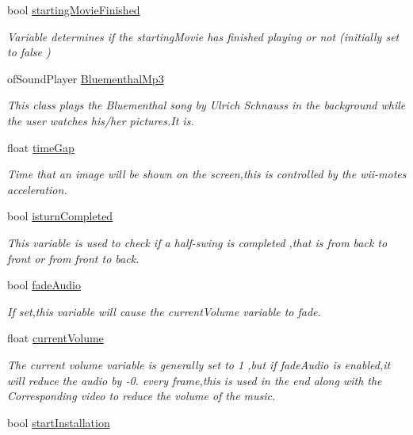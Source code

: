 \begin{DoxyCompactItemize}
bool \hyperlink{classtest_app_aea3cb9f5f0061a42a4953d6b6c949036}{starting\-Movie\-Finished}
\begin{DoxyCompactList}\small\item\em Variable determines if the starting\-Movie has finished playing or not (initially set to false ) \end{DoxyCompactList}\item 
of\-Sound\-Player \hyperlink{classtest_app_af696fd13ee9ecb38ac0ba0b72543ce06}{Bluementhal\-Mp3}
\begin{DoxyCompactList}\small\item\em This class plays the Bluementhal song by Ulrich Schnauss in the background while the user watches his/her pictures.\-It is. \end{DoxyCompactList}\item 
float \hyperlink{classtest_app_a944f2713019239a4b49241a5cc9a00c9}{time\-Gap}
\begin{DoxyCompactList}\small\item\em Time that an image will be shown on the screen,this is controlled by the wii-\/motes acceleration. \end{DoxyCompactList}\item 
bool \hyperlink{classtest_app_a42478a80a90ce9f663c04bcdaea5c5bd}{isturn\-Completed}
\begin{DoxyCompactList}\small\item\em This variable is used to check if a half-\/swing is completed ,that is from back to front or from front to back. \end{DoxyCompactList}\item 
bool \hyperlink{classtest_app_a918c09b5a4389a8402cfacb25d390226}{fade\-Audio}
\begin{DoxyCompactList}\small\item\em If set,this variable will cause the current\-Volume variable to fade. \end{DoxyCompactList}\item 
float \hyperlink{classtest_app_a51c20c5432d9f6b06f719526d9a34ee6}{current\-Volume}
\begin{DoxyCompactList}\small\item\em The current volume variable is generally set to 1 ,but if fade\-Audio is enabled,it will reduce the audio by -\/0. every frame,this is used in the end along with the Corresponding video to reduce the volume of the music. \end{DoxyCompactList}\item 
bool \hyperlink{classtest_app_a8a65a6d1a473417cec1c2ac2e6116aae}{start\-Installation}

\end{DoxyCompactItemize}
